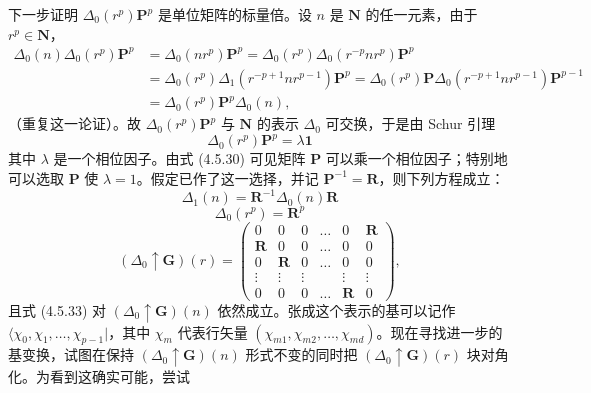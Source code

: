 下一步证明 $\Delta_{0}(r^{p})\mathbf{P}^{p}$ 是单位矩阵的标量倍。设 $n$ 是 $\mathbf{N}$ 的任一元素，由于 $r^{p} \in \mathbf{N}$，
\begin{equation*}
\begin{aligned}
\Delta_{0}(n)\Delta_{0}(r^{p})\mathbf{P}^{p} &= \Delta_{0}(nr^{p})\mathbf{P}^{p} = \Delta_{0}(r^{p})\Delta_{0}(r^{-p}nr^{p})\mathbf{P}^{p}\\
&= \Delta_{0}(r^{p})\Delta_{1}(r^{-p+1}nr^{p-1})\mathbf{P}^{p} = \Delta_{0}(r^{p})\mathbf{P}\Delta_{0}(r^{-p+1}nr^{p-1})\mathbf{P}^{p-1}\\
&= \Delta_{0}(r^{p})\mathbf{P}^{p}\Delta_{0}(n),
\end{aligned}
\end{equation*}
（重复这一论证）。故 $\Delta_{0}(r^{p})\mathbf{P}^{p}$ 与 $\mathbf{N}$ 的表示 $\Delta_{0}$ 可交换，于是由 Schur 引理
\begin{equation*}
\Delta_{0}(r^{p})\mathbf{P}^{p} = \lambda\mathbf{1}
\tag{4.5.35}
\end{equation*}
其中 $\lambda$ 是一个相位因子。由式 (4.5.30) 可见矩阵 $\mathbf{P}$ 可以乘一个相位因子；特别地可以选取 $\mathbf{P}$ 使 $\lambda = 1$。假定已作了这一选择，并记 $\mathbf{P}^{-1} = \mathbf{R}$，则下列方程成立：
\begin{equation*}
\Delta_{1}(n) = \mathbf{R}^{-1}\Delta_{0}(n)\mathbf{R}
\tag{4.5.36}
\end{equation*}
\begin{equation*}
\Delta_{0}(r^{p}) = \mathbf{R}^{p}
\tag{4.5.37}
\end{equation*}
\begin{equation*}
(\Delta_{0} \uparrow \mathbf{G})(r) = \begin{pmatrix} 0 & 0 & 0 & \dots & 0 & \mathbf{R}\\ \mathbf{R} & 0 & 0 & \dots & 0 & 0\\ 0 & \mathbf{R} & 0 & \dots & 0 & 0\\ \vdots & \vdots & \vdots & & \vdots & \vdots\\ 0 & 0 & 0 & \dots & \mathbf{R} & 0 \end{pmatrix},
\tag{4.5.38}
\end{equation*}
且式 (4.5.33) 对 $(\Delta_{0} \uparrow \mathbf{G})(n)$ 依然成立。张成这个表示的基可以记作 $\langle \chi_{0}, \chi_{1}, \dots, \chi_{p-1} |$，其中 $\chi_{m}$ 代表行矢量 $(\chi_{m1}, \chi_{m2}, \dots, \chi_{md})$。现在寻找进一步的基变换，试图在保持 $(\Delta_{0} \uparrow \mathbf{G})(n)$ 形式不变的同时把 $(\Delta_{0} \uparrow \mathbf{G})(r)$ 块对角化。为看到这确实可能，尝试
